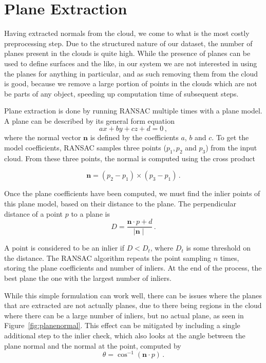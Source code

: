 \documentclass[11pt,a4paper]{kth-mag}
\begin{document}
\section{Plane Extraction}
Having extracted normals from the cloud, we come to what is the most costly
preprocessing step. Due to the structured nature of our dataset, the number of
planes present in the clouds is quite high. While the presence of planes can be
used to define surfaces and the like, in our system we are not interested in
using the planes for anything in particular, and as such removing them from the
cloud is good, because we remove a large portion of points in the clouds which
are not be parts of any object, speeding up computation time of subsequent
steps.

Plane extraction is done by running RANSAC multiple times with a plane model. A
plane can be described by its general form equation
\begin{equation}
  \label{eq:1}
  ax+by+cz+d=0\,,
\end{equation}
where the normal vector $\mathbf{n}$ is defined by the coefficients $a$, $b$ and
$c$. To get the model coefficients, RANSAC samples three points ($p_1,p_2$ and
$p_3$) from the input cloud. From these three points, the normal is computed
using the cross product \cite{planeeq}

\begin{equation}
  \label{eq:2}
  \mathbf{n}=(p_2-p_1)\times(p_3-p_1)\,.
\end{equation}

Once the plane coefficients have been computed, we must find the inlier points of this
plane model, based on their distance to the plane. The perpendicular distance of
a point $p$ to a plane is
\begin{equation}
  \label{eq:3}
  D=\frac{\mathbf{n}\cdot p + d}{\mid \mathbf{n} \mid}\,.
\end{equation}

A point is considered to be an inlier if $D<D_t$, where $D_t$ is some threshold
on the distance. The RANSAC algorithm repeats the point sampling $n$ times,
storing the plane coefficients and number of inliers. At the end of the process,
the best plane the one with the largest number of inliers.

While this simple formulation can work well, there can be issues where the
planes that are extracted are not actually planes, due to there being regions in
the cloud where there can be a large number of inliers, but no actual plane, as
seen in Figure~\ref{fig:planenormal}. This effect can be mitigated by including
a single additional step to the inlier check, which also looks at the angle
between the plane normal and the normal at the point, computed by
\begin{equation}
  \label{eq:5}
  \theta=\cos^{-1}(\mathbf{n}\cdot p)\,.
\end{equation}
\end{document}
